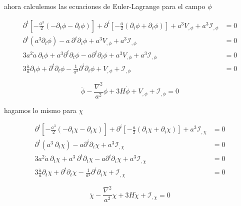 \noindent
ahora calculemos las ecuaciones de Euler-Lagrange para el campo $\phi$

\begin{equation*}
    \begin{split}
        \partial^t \left[ -\frac{a^3}{2} \left( - \partial_t \phi - \partial_t \phi \right) \right] + \partial^i \left[ -\frac{a}{2} \left( \partial_i \phi + \partial_i \phi \right) \right] + a^3 V_{, \phi} + a^3 \mathcal{I}_{,\phi} &= 0\\
        \partial^t (a^3 \partial_t \phi) - a \ \partial^i \partial_i \phi + a^3 V_{,\phi} + a^3 \mathcal{I}_{,\phi} &= 0\\
        3 a^2 \dot{a} \  \partial_t \phi + a^3 \partial^t \partial_t \phi - a \partial^i \partial_i \phi + a^3 V_{,\phi} + a^3 \mathcal{I}_{,\phi} &= 0\\
        3 \frac{\dot{a}}{a} \partial_t \phi + \partial^t \partial_t \phi - \frac{1}{a^2} \partial^i \partial_i \phi + V_{,\phi} + \mathcal{I}_{,\phi} &= 0
    \end{split}
\end{equation*}

\begin{equation}
    \ddot{\phi} - \frac{\nabla^2}{a^2} \phi + 3 H \dot{\phi} + V_{,\phi} + \mathcal{I}_{,\phi} = 0
\end{equation}

\noindent
hagamos lo mismo para $\chi$

\begin{equation*}
    \begin{split}
        \partial^t \left[ - \frac{a^3}{2} \left( - \partial_t \chi - \partial_t \chi \right) \right] + \partial^i \left[ - \frac{a}{2} \left(\partial_i \chi + \partial_i \chi \right) \right] + a^3 \mathcal{I}_{,\chi} &= 0\\
        \partial^t \left( a^3 \ \partial_t \chi \right) - a \partial^i \partial_i \chi + a^3 \mathcal{I}_{,\chi} &= 0\\
        3 a^2 \dot{a} \ \partial_t \chi + a^3 \ \partial^t \partial_t \chi - a \partial^i \partial_i \chi + a^3 \mathcal{I}_{,\chi} &= 0\\
        3 \frac{\dot{a}}{a} \partial_t \chi + \partial^t \partial_t \chi - \frac{1}{a^2} \partial^i \partial_i \chi + \mathcal{I}_{,\chi} &= 0
    \end{split}
\end{equation*}

\begin{equation}
    \ddot{\chi} - \frac{\nabla^2}{a^2} \chi + 3 H \dot{\chi} + \mathcal{I}_{,\chi} = 0
\end{equation}

